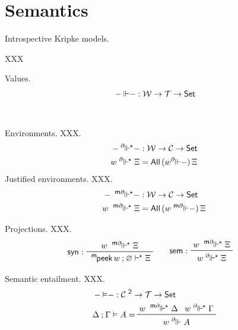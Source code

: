 \documentclass{entcs}
\newcommand{\Set}{\tsf{Set}}
\renewcommand{\r}{\mathrel{\rightarrow}}
\renewcommand{\:}{\mathrel{:}}
\renewcommand{\;}{\mathbin{;}}
\newcommand{\preop}[1]{\mathord{#1}-}
\newcommand{\binop}[1]{-\mathord{#1}-}
\newcommand{\tsf}[1]{\textsf{\upshape{#1}}}
\newcommand{\stsf}[1]{\tsf{\small{#1}}}
\newcommand{\tyrule}[1]{\prftree[l]{${#1} \:\,$}}
\newcommand{\eqrule}[1]{\prftree[l]{${#1} =$}}
\newcommand{\All}{\tsf{All}}
\newcommand{\T}{\mathcal{T}}
\newcommand{\C}{\mathcal{C}}
\newcommand{\CZ}{\mathcal{C}^{\stsf{2}}}
\renewcommand{\O}{\varnothing}
\newcommand{\es}{\mathrel{\vdash^{\mkern-2mu\star}}}
\newcommand{\W}{\mathcal{W}}
\newcommand{\mpeek}{\operatorname{^{\stsf{m}\mkern-2mu}\tsf{peek}}}
\newcommand{\ee}{\mathrel{\Vdash}}
\newcommand{\dee}{\mathrel{^{\partial\mkern-7mu}\Vdash}}
\newcommand{\mdee}{\mathrel{^{\stsf{m}\partial\mkern-7mu}\Vdash}}
\newcommand{\dees}{\mathrel{^{\partial\mkern-7mu}\Vdash^{\mkern-2mu\star}}}
\newcommand{\mdees}{\mathrel{^{\stsf{m}\partial\mkern-7mu}\Vdash^{\mkern-2mu\star}}}
\newcommand{\syn}{\operatorname{\tsf{syn}}}
\newcommand{\sem}{\operatorname{\tsf{sem}}}
\newcommand{\eeq}{\mathrel{\vDash}}
\begin{document}


\section{Semantics}



\begin{definition}
  Introspective Kripke models.

XXX
\end{definition}


\begin{definition}
  Values.
  \begin{align*}
    & \binop{\ee} \: \W \r \T \r \Set\\[0.5\baselineskip]
    & 
  \end{align*}
\end{definition}


\begin{definition}
  Environments.  XXX.
  \begin{align*}
    & \binop{\dees} \: \W \r \C \r \Set\\
    & w \dees \Xi = \All\,(w \preop{\dee})\,\Xi
  \end{align*}
  Justified environments.  XXX.
  \begin{align*}
    & \binop{\mdees} \: \W \r \C \r \Set\\
    & w \mdees \Xi = \All\,(w \preop{\mdee})\,\Xi
  \end{align*}
\end{definition}


\begin{lemma}
  Projections.  XXX.
  \begin{align*}
    & \tyrule{\syn}{w \mdees \Xi}
                   {\mpeek w \; \O \es \Xi}
      \qquad
      \tyrule{\sem}{w \mdees \Xi}
                   {w \dees \Xi}
  \end{align*}
\end{lemma}


\begin{definition}
  Semantic entailment.  XXX.
  \begin{align*}
    & \binop{\eeq} \: \CZ \r \T \r \Set\\
    & \eqrule{\Delta \; \Gamma \eeq A}{w \mdees \Delta}{w \dees \Gamma}
                                      {w \dee A}
  \end{align*}
\end{definition}
\end{document}

